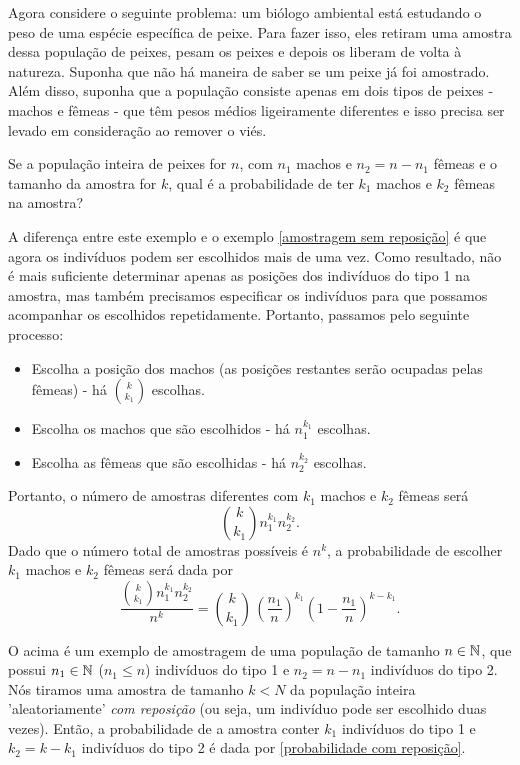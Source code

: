 \begin{example}
\label{amostragem com reposição}
Agora considere o seguinte problema: um biólogo ambiental está estudando o peso de uma espécie específica de peixe. Para fazer isso, eles retiram uma amostra dessa população de peixes, pesam os peixes e depois os liberam de volta à natureza. Suponha que não há maneira de saber se um peixe já foi amostrado. Além disso, suponha que a população consiste apenas em dois tipos de peixes - machos e fêmeas - que têm pesos médios ligeiramente diferentes e isso precisa ser levado em consideração ao remover o viés.

Se a população inteira de peixes for $n$, com $n_1$ machos e $n_2 = n-n_1$ fêmeas e o tamanho da amostra for $k$, qual é a probabilidade de ter $k_1$ machos e $k_2$ fêmeas na amostra?

A diferença entre este exemplo e o exemplo \ref{amostragem sem reposição} é que agora os indivíduos podem ser escolhidos mais de uma vez. Como resultado, não é mais suficiente determinar apenas as posições dos indivíduos do tipo 1 na amostra, mas também precisamos especificar os indivíduos para que possamos acompanhar os escolhidos repetidamente. Portanto, passamos pelo seguinte processo:
\begin{itemize}
    \item Escolha a posição dos machos (as posições restantes serão ocupadas pelas fêmeas) - há $\binom{k}{k_1}$ escolhas.
    \item Escolha os machos que são escolhidos - há $n_1^{k_1}$ escolhas.
    \item Escolha as fêmeas que são escolhidas - há $n_2^{k_2}$ escolhas.
\end{itemize}
Portanto, o número de amostras diferentes com $k_1$ machos e $k_2$ fêmeas será 
\[
\binom{k}{k_1} n_1^{k_1} n_2^{k_2}.
\]
Dado que o número total de amostras possíveis é $n^k$, a probabilidade de escolher $k_1$ machos e $k_2$ fêmeas será dada por 
\begin{equation}
\label{probabilidade com reposição}
\frac{\binom{k}{k_1} n_1^{k_1} n_2^{k_2}}{n^k} = \binom{k}{k_1} \, \left(\frac{n_1}{n}\right)^{k_1} \left(1-\frac{n_1}{n}\right)^{k-k_1}. 
\end{equation}
\end{example}

O acima é um exemplo de amostragem de uma população de tamanho $n \in \mathbb{N}$, que possui $n_1 \in \mathbb{N}$ ($n_1 \leq n$) indivíduos do tipo 1 e $n_2 = n-n_1$ indivíduos do tipo 2. Nós tiramos uma amostra de tamanho $k<N$ da população inteira 'aleatoriamente' {\it com reposição} (ou seja, um indivíduo pode ser escolhido duas vezes). Então, a probabilidade de a amostra conter $k_1$ indivíduos do tipo 1 e $k_2 = k-k_1$ indivíduos do tipo 2 é dada por \eqref{probabilidade com reposição}.

